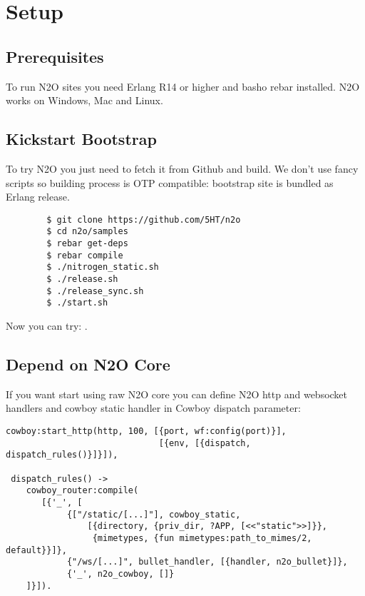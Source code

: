 \section{Setup}

\subsection{Prerequisites}
To run N2O sites you need Erlang R14 or higher and basho rebar installed.
N2O works on Windows, Mac and Linux.

\subsection{Kickstart Bootstrap}
To try N2O you just need to fetch it from Github and build. We don't use
fancy scripts so building process is OTP compatible: bootstrap site
is bundled as Erlang release.

\vspace{1\baselineskip}
\begin{lstlisting}
        $ git clone https://github.com/5HT/n2o
        $ cd n2o/samples
        $ rebar get-deps
        $ rebar compile
        $ ./nitrogen_static.sh
        $ ./release.sh
        $ ./release_sync.sh
        $ ./start.sh
\end{lstlisting}
\vspace{1\baselineskip}

Now you can try: .

\newpage
\subsection{Depend on N2O Core}
If you want start using raw N2O core you can define N2O http and websocket handlers and cowboy static
handler in Cowboy dispatch parameter:

\begin{lstlisting}[caption=web\_sup.erl]
 cowboy:start_http(http, 100, [{port, wf:config(port)}],
                              [{env, [{dispatch, dispatch_rules()}]}]),

 dispatch_rules() ->
    cowboy_router:compile(
       [{'_', [
            {["/static/[...]"], cowboy_static,
                [{directory, {priv_dir, ?APP, [<<"static">>]}},
                 {mimetypes, {fun mimetypes:path_to_mimes/2, default}}]}, 
            {"/ws/[...]", bullet_handler, [{handler, n2o_bullet}]},
            {'_', n2o_cowboy, []}
    ]}]).
\end{lstlisting}


